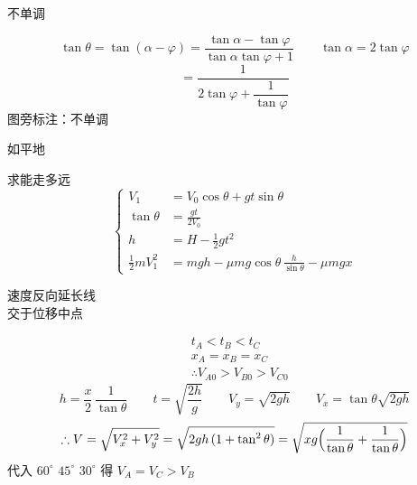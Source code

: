 \noindent 不单调

\begin{problem}
\begin{solution}
\[ \tan\theta=\tan(\alpha-\varphi)=\frac{\tan\alpha-\tan\varphi}{\tan\alpha\tan\varphi+1}\qquad\tan\alpha=2\tan\varphi \]
\[ =\frac{1}{2\tan\varphi+\dfrac{1}{\tan\varphi}} \]
图旁标注：不单调
\end{solution}
\end{problem}

\noindent 如平地%

\noindent 求能走多远
\[
\left\{\begin{aligned}
V_1&=V_0\cos\theta+gt\sin\theta\\
\tan\theta&=\frac{gt}{2V_0}\\
h&=H-\tfrac12gt^2\\
\tfrac12mV_1^2&=mgh-\mu mg\cos\theta\,\frac{h}{\sin\theta}-\mu mgx
\end{aligned}\right.
\]

\begin{problem}[3、平抛]
速度反向延长线\\交于位移中点
\begin{solution}
\begin{align*}
&t_A<t_B<t_C\\
&x_A=x_B=x_C\\
&\therefore V_{A0}>V_{B0}>V_{C0}
\end{align*}
\[ h=\frac{x}{2}\,\frac{1}{\tan\theta}\qquad t=\sqrt{\frac{2h}{g}}\qquad V_y=\sqrt{2gh}\qquad V_x=\tan\theta\sqrt{2gh} \]
\[ \therefore V=\sqrt{V_x^2+V_y^2}=\sqrt{2gh\,(1+\tan^2\theta)}=\sqrt{xg\Bigl(\frac{1}{\tan\theta}+\frac{1}{\tan\theta}\Bigr)} \] %
代入 $60^\circ$ $45^\circ$ $30^\circ$ 得 $V_A=V_C>V_B$
\end{solution}
\end{problem}

